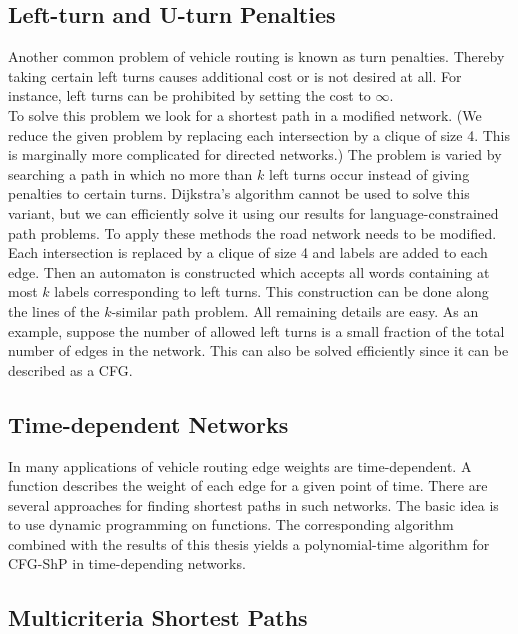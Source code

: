 \documentclass[]{article}
\numberwithin{equation}{section}
\begin{document}
\subsection{Left-turn and U-turn Penalties}

Another common problem of vehicle routing is known as turn penalties. Thereby taking certain left turns causes additional cost or is not desired at all. For instance, left turns can be prohibited by setting the cost to $\infty$.\\

To solve this problem we look for a shortest path in a modified network. (We reduce the given problem by replacing each intersection by a clique of size 4. This is marginally more complicated for directed networks.) The problem is varied by searching a path in which no more than $k$ left turns occur instead of giving penalties to certain turns. Dijkstra's algorithm cannot be used to solve this variant, but we can efficiently solve it using our results for language-constrained path problems. To apply these methods the road network needs to be modified. Each intersection is replaced by a clique of size 4 and labels are added to each edge. Then an automaton is constructed which accepts all words containing at most $k$ labels corresponding to left turns. This construction can be done along the lines of the $k$-similar path problem. All remaining details are easy. As an example, suppose the number of allowed left turns is a small fraction of the total number of edges in the network. This can also be solved efficiently since it can be described as a CFG.

\subsection{Time-dependent Networks}

In many applications of vehicle routing edge weights are time-dependent. A function describes the weight of each edge for a given point of time. There are several approaches for finding shortest paths in such networks. The basic idea is to use dynamic programming on functions. The corresponding algorithm combined with the results of this thesis yields a polynomial-time algorithm for CFG-ShP in time-depending networks.

\subsection{Multicriteria Shortest Paths}
\end{document}
